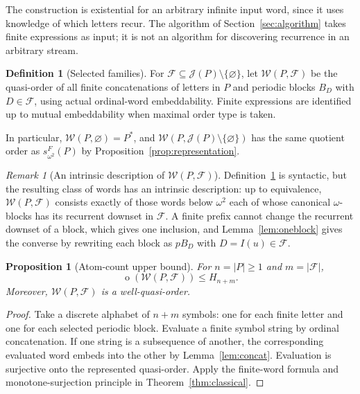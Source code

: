 \documentclass[11pt,a4paper]{article}
\numberwithin{equation}{section}
\newtheorem{proposition}[theorem]{Proposition}
\theoremstyle{definition}
\newtheorem{definition}[theorem]{Definition}
\theoremstyle{remark}
\newtheorem{remark}[theorem]{Remark}
\newcommand{\mot}{\mathop{o}}
\newcommand{\W}{\mathcal W}
\newcommand{\J}{\mathcal J}
\newcommand{\F}{\mathcal F}
\newcommand{\Wordspace}[1]{s_{\omega^2}^{F}(#1)}
\begin{document}
The construction is existential for an arbitrary infinite input word, since it
uses knowledge of which letters recur. The algorithm of
Section~\ref{sec:algorithm} takes finite expressions as input; it is not an
algorithm for discovering recurrence in an arbitrary stream.

\begin{definition}[Selected families]\label{def:selected}
For $\F\subseteq\J(P)\setminus\{\varnothing\}$, let $\W(P,\F)$ be the
quasi-order of all finite concatenations of letters in $P$ and periodic
blocks $B_D$ with $D\in\F$, using actual ordinal-word embeddability.
Finite expressions are identified up to mutual embeddability when maximal
order type is taken.
\end{definition}

In particular, $\W(P,\varnothing)=P^*$, and
$\W(P,\J(P)\setminus\{\varnothing\})$ has the same quotient order as
$\Wordspace P$ by Proposition~\ref{prop:representation}.

\begin{remark}[An intrinsic description of $\W(P,\F)$]\label{rem:intrinsic}
Definition~\ref{def:selected} is syntactic, but the resulting class of words
has an intrinsic description: up to equivalence, $\W(P,\F)$ consists exactly
of those words below $\omega^2$ each of whose canonical $\omega$-blocks has
its recurrent downset in $\F$. A finite prefix cannot change the recurrent
downset of a block, which gives one inclusion, and
Lemma~\ref{lem:oneblock} gives the converse by rewriting each block as
$pB_D$ with $D=I(u)\in\F$.
\end{remark}

\begin{proposition}[Atom-count upper bound]\label{prop:upper}
For $n=|P|\ge1$ and $m=|\F|$,
\begin{equation}\label{eq:upper}
 \mot(\W(P,\F))\le H_{n+m}.
\end{equation}
Moreover, $\W(P,\F)$ is a well-quasi-order.
\end{proposition}
\begin{proof}
Take a discrete alphabet of $n+m$ symbols: one for each finite letter and
one for each selected periodic block. Evaluate a finite symbol string by
ordinal concatenation. If one string is a subsequence of another, the
corresponding evaluated word embeds into the other by
Lemma~\ref{lem:concat}. Evaluation is surjective onto the represented
quasi-order. Apply the finite-word formula and monotone-surjection
principle in Theorem~\ref{thm:classical}.
\end{proof}
\end{document}
